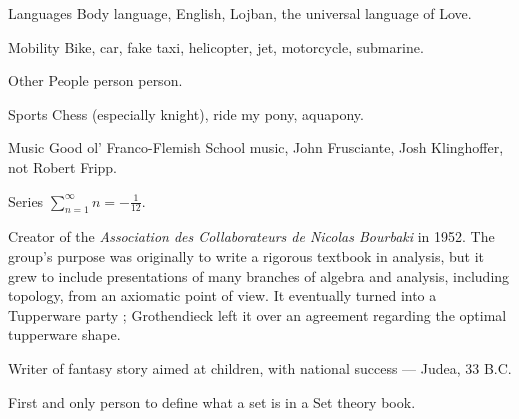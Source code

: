 \documentclass{LoLaTeXcv}
\begin{document}
\begin{lltxDescription}
	\item[Languages] Body language, English, Lojban, the universal language of Love.
	\item[Mobility] Bike, car, fake taxi, helicopter, jet, motorcycle, submarine.
	\item[Other] People person person.
\end{lltxDescription}

\begin{lltxDescription}
	\item[Sports] Chess (especially knight), ride my pony, aquapony.
	\item[Music] Good ol' Franco-Flemish School music, John Frusciante, Josh Klinghoffer, not Robert Fripp.
	\item[Series] $\sum_{n=1}^\infty n = -\frac{1}{12}$.
\end{lltxDescription}



\begin{lltxItemize}
	\item Creator of the \emph{Association des Collaborateurs de Nicolas Bourbaki} in
		1952. The group's purpose was originally to write a rigorous textbook
		in analysis, but it grew to include presentations of many branches of
		algebra and analysis, including topology, from an axiomatic point of
		view. It eventually turned into a Tupperware party ; Grothendieck left it 
		over an agreement regarding the optimal tupperware shape.
\end{lltxItemize}

\begin{lltxItemize}
	\item Writer of fantasy story aimed at children, with national success — Judea, 33 B.C.
	\item First and only person to define what a set is in a Set theory book.
\end{lltxItemize}
\end{document}
